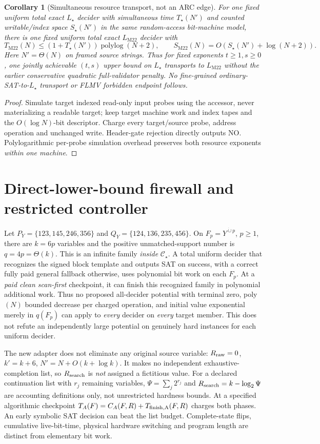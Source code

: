 \documentclass[11pt]{article}
\newtheorem{corollary}[theorem]{Corollary}
\newcommand{\CS}{\mathcal C_\star}
\begin{document}
\begin{corollary}[Simultaneous resource transport, not an ARC edge]
For one fixed uniform total exact $L_\star$ decider with simultaneous time $T_\star(N')$ and counted writable/index space $S_\star(N')$ in the same random-access bit-machine model, there is one fixed uniform total exact $L_{\mathrm{M22}}$ decider with
\[
T_{\mathrm{M22}}(N)\le(1+T_\star(N'))\operatorname{polylog}(N+2),\qquad
S_{\mathrm{M22}}(N)=O(S_\star(N')+\log(N+2)).
\]
Here $N'=\Theta(N)$ on framed source strings. Thus for fixed exponents $t\ge1,s\ge0$, one jointly achievable $(t,s)$ upper bound on $L_\star$ transports to $L_{\mathrm{M22}}$ without the earlier conservative quadratic full-validator penalty. No fine-grained ordinary-SAT-to-$L_\star$ transport or FLMV forbidden endpoint follows.
\end{corollary}
\begin{proof}
Simulate target indexed read-only input probes using the accessor, never materializing a readable target; keep target machine work and index tapes and the $O(\log N)$-bit descriptor. Charge every target/source probe, address operation and unchanged write. Header-gate rejection directly outputs NO. Polylogarithmic per-probe simulation overhead preserves both resource exponents \emph{within one machine}.
\end{proof}

\section{Direct-lower-bound firewall and restricted controller}
Let $P_Y=\{123,145,246,356\}$ and $Q_Y=\{124,136,235,456\}$. On $F_p=Y^{\dot\cup p}$, $p\ge1$, there are $k=6p$ variables and the positive unmatched-support number is $q=4p=\Theta(k)$. This is an infinite family \emph{inside} $\CS$. A total uniform decider that recognizes the signed block template and outputs SAT on success, with a correct fully paid general fallback otherwise, uses polynomial bit work on each $F_p$. At a \emph{paid clean scan-first} checkpoint, it can finish this recognized family in polynomial additional work. Thus no proposed all-decider potential with terminal zero, poly$(N)$ bounded decrease per charged operation, and initial value exponential merely in $q(F_p)$ can apply to \emph{every} decider on \emph{every} target member. This does not refute an independently large potential on genuinely hard instances for each uniform decider.

The new adapter does not eliminate any original source variable: $R_{\rm raw}=0$, $k'=k+6$, $N'=N+O(k+\log k)$. It makes no independent exhaustive-completion list, so $R_{\rm search}$ is \emph{not} assigned a fictitious value. For a declared continuation list with $r_j$ remaining variables, $\Psi=\sum_j2^{r_j}$ and $R_{\rm search}=k-\log_2\Psi$ are accounting definitions only, not unrestricted hardness bounds. At a specified algorithmic checkpoint $T_A(F)=C_A(F,R)+T_{\rm finish,A}(F,R)$ charges both phases. An early symbolic SAT decision can beat the list budget. Complete-state flips, cumulative live-bit-time, physical hardware switching and program length are distinct from elementary bit work.
\end{document}
